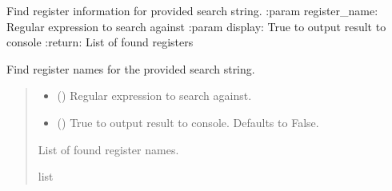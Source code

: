 \documentclass[letterpaper,10pt,english]{sphinxmanual}
\begin{document}
\begin{fulllineitems}
\begin{fulllineitems}
\label{\detokenize{apidocs:management.MANAGEMENT.find_register}}
\pysigstartsignatures
{}
\pysigstopsignatures
\sphinxAtStartPar
Find register information for provided search string.
:param register\_name: Regular expression to search against
:param display: True to output result to console
:return: List of found registers

\end{fulllineitems}


\begin{fulllineitems}
\label{\detokenize{apidocs:management.MANAGEMENT.find_register_names}}
\pysigstartsignatures
{}
\pysigstopsignatures
\sphinxAtStartPar
Find register names for the provided search string.
\begin{quote}\begin{description}
\begin{itemize}
\item {} 
\sphinxAtStartPar
{} () \textendash{} Regular expression to search against.

\item {} 
\sphinxAtStartPar
{} (\sphinxstyleliteralemphasis{\sphinxupquote{, }}) \textendash{} True to output result to console. Defaults to False.

\end{itemize}

\sphinxAtStartPar
List of found register names.

\sphinxAtStartPar
list

\end{description}\end{quote}


\end{fulllineitems}
\end{fulllineitems}
\end{document}
